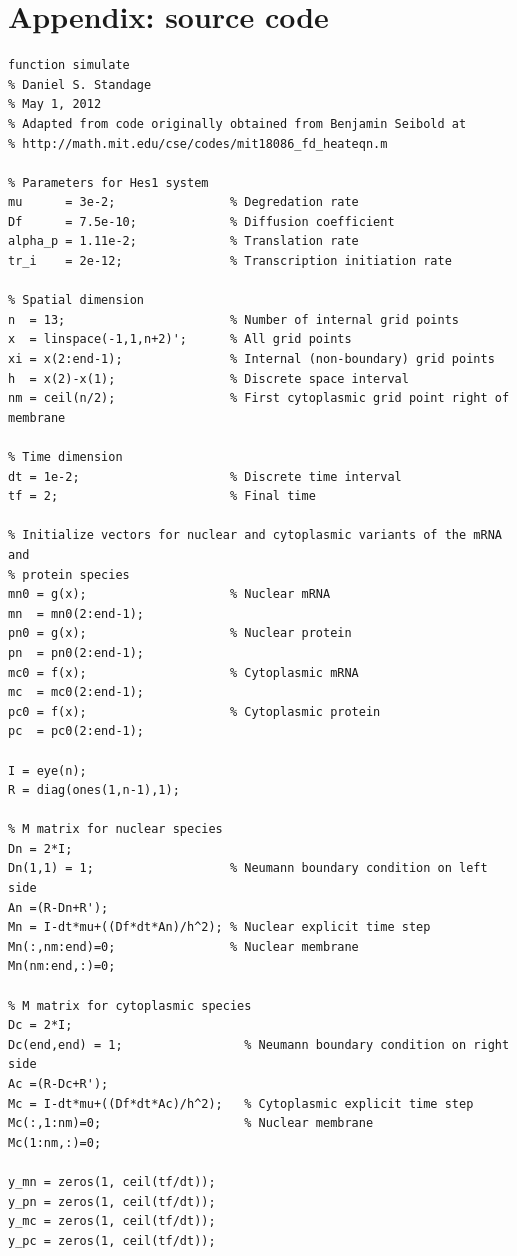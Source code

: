 \documentclass{bioinfo}
\begin{document}
\section*{Appendix: source code}
\begin{verbatim}
function simulate
% Daniel S. Standage
% May 1, 2012
% Adapted from code originally obtained from Benjamin Seibold at
% http://math.mit.edu/cse/codes/mit18086_fd_heateqn.m

% Parameters for Hes1 system
mu      = 3e-2;                % Degredation rate 
Df      = 7.5e-10;             % Diffusion coefficient
alpha_p = 1.11e-2;             % Translation rate
tr_i    = 2e-12;               % Transcription initiation rate

% Spatial dimension
n  = 13;                       % Number of internal grid points
x  = linspace(-1,1,n+2)';      % All grid points
xi = x(2:end-1);               % Internal (non-boundary) grid points
h  = x(2)-x(1);                % Discrete space interval
nm = ceil(n/2);                % First cytoplasmic grid point right of membrane

% Time dimension
dt = 1e-2;                     % Discrete time interval
tf = 2;                        % Final time

% Initialize vectors for nuclear and cytoplasmic variants of the mRNA and
% protein species
mn0 = g(x);                    % Nuclear mRNA
mn  = mn0(2:end-1);
pn0 = g(x);                    % Nuclear protein
pn  = pn0(2:end-1);   
mc0 = f(x);                    % Cytoplasmic mRNA
mc  = mc0(2:end-1);
pc0 = f(x);                    % Cytoplasmic protein
pc  = pc0(2:end-1);

I = eye(n);
R = diag(ones(1,n-1),1);

% M matrix for nuclear species
Dn = 2*I;
Dn(1,1) = 1;                   % Neumann boundary condition on left side
An =(R-Dn+R');
Mn = I-dt*mu+((Df*dt*An)/h^2); % Nuclear explicit time step
Mn(:,nm:end)=0;                % Nuclear membrane
Mn(nm:end,:)=0;

% M matrix for cytoplasmic species
Dc = 2*I;
Dc(end,end) = 1;                 % Neumann boundary condition on right side
Ac =(R-Dc+R');                              
Mc = I-dt*mu+((Df*dt*Ac)/h^2);   % Cytoplasmic explicit time step
Mc(:,1:nm)=0;                    % Nuclear membrane
Mc(1:nm,:)=0;

y_mn = zeros(1, ceil(tf/dt));
y_pn = zeros(1, ceil(tf/dt));
y_mc = zeros(1, ceil(tf/dt));
y_pc = zeros(1, ceil(tf/dt));


\end{verbatim}
\end{document}
